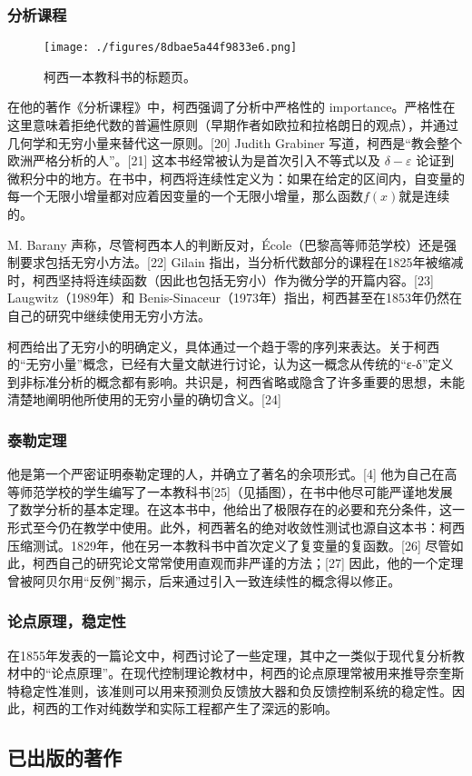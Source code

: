 \subsubsection{分析课程}
\begin{figure}[ht]
\centering
\texttt{[image: ./figures/8dbae5a44f9833e6.png]}
\caption{柯西一本教科书的标题页。} \label{fig_August_3}
\end{figure}
在他的著作《分析课程》中，柯西强调了分析中严格性的 importance。严格性在这里意味着拒绝代数的普遍性原则（早期作者如欧拉和拉格朗日的观点），并通过几何学和无穷小量来替代这一原则。[20] Judith Grabiner 写道，柯西是“教会整个欧洲严格分析的人”。[21] 这本书经常被认为是首次引入不等式以及 \(\delta - \varepsilon\) 论证到微积分中的地方。在书中，柯西将连续性定义为：如果在给定的区间内，自变量的每一个无限小增量都对应着因变量的一个无限小增量，那么函数\(f(x)\)就是连续的。

M. Barany 声称，尽管柯西本人的判断反对，École（巴黎高等师范学校）还是强制要求包括无穷小方法。[22] Gilain 指出，当分析代数部分的课程在1825年被缩减时，柯西坚持将连续函数（因此也包括无穷小）作为微分学的开篇内容。[23] Laugwitz（1989年）和 Benis-Sinaceur（1973年）指出，柯西甚至在1853年仍然在自己的研究中继续使用无穷小方法。

柯西给出了无穷小的明确定义，具体通过一个趋于零的序列来表达。关于柯西的“无穷小量”概念，已经有大量文献进行讨论，认为这一概念从传统的“ε-δ”定义到非标准分析的概念都有影响。共识是，柯西省略或隐含了许多重要的思想，未能清楚地阐明他所使用的无穷小量的确切含义。[24]
\subsubsection{泰勒定理}
他是第一个严密证明泰勒定理的人，并确立了著名的余项形式。[4] 他为自己在高等师范学校的学生编写了一本教科书[25]（见插图），在书中他尽可能严谨地发展了数学分析的基本定理。在这本书中，他给出了极限存在的必要和充分条件，这一形式至今仍在教学中使用。此外，柯西著名的绝对收敛性测试也源自这本书：柯西压缩测试。1829年，他在另一本教科书中首次定义了复变量的复函数。[26] 尽管如此，柯西自己的研究论文常常使用直观而非严谨的方法；[27] 因此，他的一个定理曾被阿贝尔用“反例”揭示，后来通过引入一致连续性的概念得以修正。
\subsubsection{论点原理，稳定性}
在1855年发表的一篇论文中，柯西讨论了一些定理，其中之一类似于现代复分析教材中的“论点原理”。在现代控制理论教材中，柯西的论点原理常被用来推导奈奎斯特稳定性准则，该准则可以用来预测负反馈放大器和负反馈控制系统的稳定性。因此，柯西的工作对纯数学和实际工程都产生了深远的影响。
\subsection{已出版的著作}
